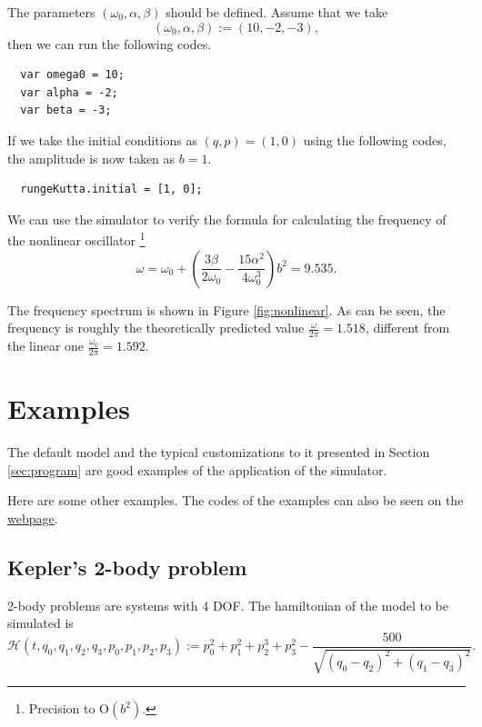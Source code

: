 \documentclass[12pt]{article}
\begin{document}
The parameters $\left(\omega_0,\alpha,\beta\right)$ should be defined.
Assume that we take
\begin{equation*}
  \left(\omega_0,\alpha,\beta\right):=\left(10,-2,-3\right),
\end{equation*}
then we can run the following codes.

\begin{verbatim}
  var omega0 = 10;
  var alpha = -2;
  var beta = -3;
\end{verbatim}

If we take the initial conditions as $\left(q,p\right)=\left(1,0\right)$ using the following codes,
the amplitude is now taken as $b=1$.

\begin{verbatim}
  rungeKutta.initial = [1, 0];
\end{verbatim}

We can use the simulator to verify the formula for calculating the frequency of the nonlinear oscillator \cite[p. 87]{landau1976mechanics}\footnote{
  Precision to $\mathrm O\left(b^2\right)$.
}
\begin{equation*}
  \omega=\omega_0+\left(\frac{3\beta}{2\omega_0}-\frac{15\alpha^2}{4\omega_0^3}\right)b^2=9.535.
\end{equation*}

The frequency spectrum is shown in Figure \ref{fig:nonlinear}.
As can be seen, the frequency is roughly the theoretically predicted value $\frac\omega{2\pi}=1.518$,
different from the linear one $\frac{\omega_0}{2\pi}=1.592$.

\section{Examples}
\label{sec:examples}

The default model and the typical customizations to it presented in Section \ref{sec:program}
are good examples of the application of the simulator.

Here are some other examples.
The codes of the examples can also be seen on the
\href{https://ulysseszh.github.io/rpg/mechsimul2/examples.html}{webpage}.

\subsection{Kepler's 2-body problem}

2-body problems are systems with $4$ DOF.
The hamiltonian of the model to be simulated is
\begin{equation*}
  \mathcal H\left(t,q_0,q_1,q_2,q_3,p_0,p_1,p_2,p_3\right):=
  p_0^2+p_1^2+p_2^3+p_3^2-\frac{500}{\sqrt{\left(q_0-q_2\right)^2+\left(q_1-q_3\right)^2}}.
\end{equation*}
\end{document}
